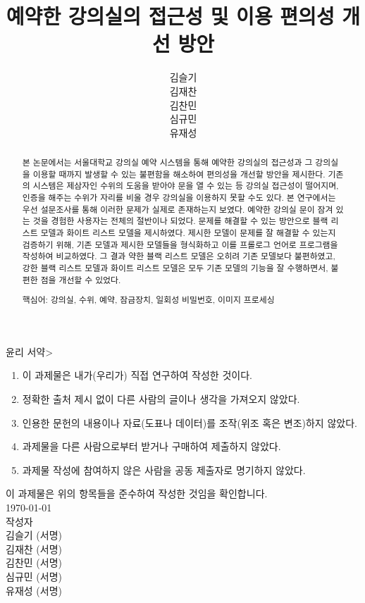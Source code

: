 \documentclass[11pt,a4paper]{article}
\begin{document}
\title{예약한 강의실의 접근성 및 이용 편의성 개선 방안}
\author{
김슬기\\
김재찬\\
김찬민\\
심규민\\
유재성
}
\date{}
\maketitle

\begin{framed}

\centerline{ 윤리 서약\textgreater}

\begin{enumerate}
\item 이 과제물은 내가(우리가) 직접 연구하여 작성한 것이다.
\item 정확한 출처 제시 없이 다른 사람의 글이나 생각을 가져오지 않았다.
\item 인용한 문헌의 내용이나 자료(도표나 데이터)를 조작(위조 혹은 변조)하지 않았다.
\item 과제물을 다른 사람으로부터 받거나 구매하여 제출하지 않았다.
\item 과제물 작성에 참여하지 않은 사람을 공동 제출자로 명기하지 않았다.
\end{enumerate}

\begin{center}
이 과제물은 위의 항목들을 준수하여 작성한 것임을 확인합니다.\\
\hfill\break
\koreandate\today\\
\hfill\break
작성자\\
\hfill\break
김슬기 (서명)\\
김재찬 (서명)\\
김찬민 (서명)\\
심규민 (서명)\\
유재성 (서명)
\end{center}

\end{framed}

\renewcommand{\abstractname}{초록}
\begin{abstract}
본 논문에서는 서울대학교 강의실 예약 시스템을 통해 예약한 강의실의 접근성과 그 강의실을 이용할 때까지 발생할 수 있는 불편함을 해소하여 편의성을 개선할 방안을 제시한다. 기존의 시스템은 제삼자인 수위의 도움을 받아야 문을 열 수 있는 등 강의실 접근성이 떨어지며, 인증을 해주는 수위가 자리를 비울 경우 강의실을 이용하지 못할 수도 있다. 본 연구에서는 우선 설문조사를 통해 이러한 문제가 실제로 존재하는지 보였다. 예약한 강의실 문이 잠겨 있는 것을 경험한 사용자는 전체의 절반이나 되었다. 문제를 해결할 수 있는 방안으로 블랙 리스트 모델과 화이트 리스트 모델을 제시하였다. 제시한 모델이 문제를 잘 해결할 수 있는지 검증하기 위해, 기존 모델과 제시한 모델들을 형식화하고 이를 프롤로그 언어로 프로그램을 작성하여 비교하였다. 그 결과 약한 블랙 리스트 모델은 오히려 기존 모델보다 불편하였고, 강한 블랙 리스트 모델과 화이트 리스트 모델은 모두 기존 모델의 기능을 잘 수행하면서, 불편한 점을 개선할 수 있었다.\\
\centerline{핵심어: 강의실, 수위, 예약, 잠금장치, 일회성 비밀번호, 이미지 프로세싱}
\end{abstract}
\end{document}
